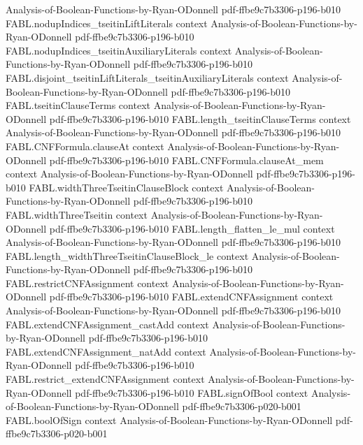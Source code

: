 \begin{theorem}
  {Analysis-of-Boolean-Functions-by-Ryan-ODonnell}
  {pdf-ffbe9c7b3306-p196-b010}
\proofstep
  {FABL.nodupIndices_tseitinLiftLiterals}
  {context}
  {Analysis-of-Boolean-Functions-by-Ryan-ODonnell}
  {pdf-ffbe9c7b3306-p196-b010}
\proofstep
  {FABL.nodupIndices_tseitinAuxiliaryLiterals}
  {context}
  {Analysis-of-Boolean-Functions-by-Ryan-ODonnell}
  {pdf-ffbe9c7b3306-p196-b010}
\proofstep
  {FABL.disjoint_tseitinLiftLiterals_tseitinAuxiliaryLiterals}
  {context}
  {Analysis-of-Boolean-Functions-by-Ryan-ODonnell}
  {pdf-ffbe9c7b3306-p196-b010}
\proofstep
  {FABL.tseitinClauseTerms}
  {context}
  {Analysis-of-Boolean-Functions-by-Ryan-ODonnell}
  {pdf-ffbe9c7b3306-p196-b010}
\proofstep
  {FABL.length_tseitinClauseTerms}
  {context}
  {Analysis-of-Boolean-Functions-by-Ryan-ODonnell}
  {pdf-ffbe9c7b3306-p196-b010}
\proofstep
  {FABL.CNFFormula.clauseAt}
  {context}
  {Analysis-of-Boolean-Functions-by-Ryan-ODonnell}
  {pdf-ffbe9c7b3306-p196-b010}
\proofstep
  {FABL.CNFFormula.clauseAt_mem}
  {context}
  {Analysis-of-Boolean-Functions-by-Ryan-ODonnell}
  {pdf-ffbe9c7b3306-p196-b010}
\proofstep
  {FABL.widthThreeTseitinClauseBlock}
  {context}
  {Analysis-of-Boolean-Functions-by-Ryan-ODonnell}
  {pdf-ffbe9c7b3306-p196-b010}
\proofstep
  {FABL.widthThreeTseitin}
  {context}
  {Analysis-of-Boolean-Functions-by-Ryan-ODonnell}
  {pdf-ffbe9c7b3306-p196-b010}
\proofstep
  {FABL.length_flatten_le_mul}
  {context}
  {Analysis-of-Boolean-Functions-by-Ryan-ODonnell}
  {pdf-ffbe9c7b3306-p196-b010}
\proofstep
  {FABL.length_widthThreeTseitinClauseBlock_le}
  {context}
  {Analysis-of-Boolean-Functions-by-Ryan-ODonnell}
  {pdf-ffbe9c7b3306-p196-b010}
\proofstep
  {FABL.restrictCNFAssignment}
  {context}
  {Analysis-of-Boolean-Functions-by-Ryan-ODonnell}
  {pdf-ffbe9c7b3306-p196-b010}
\proofstep
  {FABL.extendCNFAssignment}
  {context}
  {Analysis-of-Boolean-Functions-by-Ryan-ODonnell}
  {pdf-ffbe9c7b3306-p196-b010}
\proofstep
  {FABL.extendCNFAssignment_castAdd}
  {context}
  {Analysis-of-Boolean-Functions-by-Ryan-ODonnell}
  {pdf-ffbe9c7b3306-p196-b010}
\proofstep
  {FABL.extendCNFAssignment_natAdd}
  {context}
  {Analysis-of-Boolean-Functions-by-Ryan-ODonnell}
  {pdf-ffbe9c7b3306-p196-b010}
\proofstep
  {FABL.restrict_extendCNFAssignment}
  {context}
  {Analysis-of-Boolean-Functions-by-Ryan-ODonnell}
  {pdf-ffbe9c7b3306-p196-b010}
\proofstep
  {FABL.signOfBool}
  {context}
  {Analysis-of-Boolean-Functions-by-Ryan-ODonnell}
  {pdf-ffbe9c7b3306-p020-b001}
\proofstep
  {FABL.boolOfSign}
  {context}
  {Analysis-of-Boolean-Functions-by-Ryan-ODonnell}
  {pdf-ffbe9c7b3306-p020-b001}

\end{theorem}
